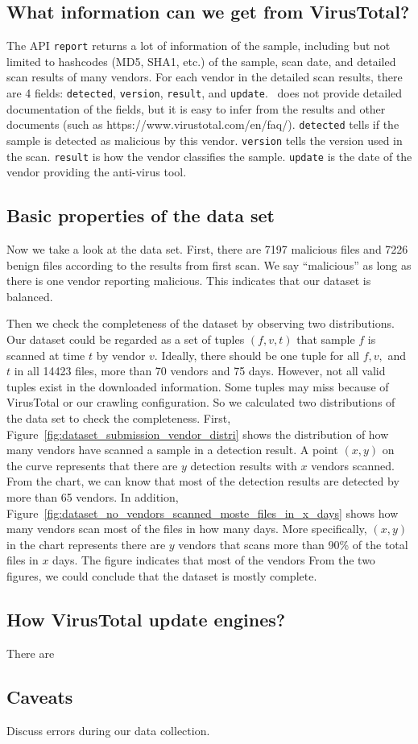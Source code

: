 \subsection{What information can we get from VirusTotal?}%

The API \texttt{report} returns a lot of information of the sample, including but not limited to hashcodes (MD5, SHA1, etc.) of the sample, scan date, and detailed scan results of many vendors. For each vendor in the detailed scan results, there are 4 fields: \texttt{detected}, \texttt{version}, \texttt{result}, and \texttt{update}. \vt\ does not provide detailed documentation of the fields, but it is easy to infer from the results and other documents (such as https://www.virustotal.com/en/faq/). \texttt{detected} tells if the sample is detected as malicious by this vendor. \texttt{version} tells the version used in the scan. \texttt{result} is how the vendor classifies the sample. \texttt{update} is the date of the vendor providing the anti-virus tool.

\subsection{Basic properties of the data set}

Now we take a look at the data set. First, there are 7197 malicious files and 7226 benign files according to the results from first scan. We say ``malicious'' as long as there is one vendor reporting malicious. This indicates that our dataset is balanced.

Then we check the completeness of the dataset by observing two distributions. 
Our dataset could be regarded as a set of tuples $(f, v, t)$ that sample $f$ is scanned at time $t$ by vendor $v$. Ideally, there should be one tuple for all $f, v, $ and $t$ in all 14423 files, more than 70 vendors and 75 days. 
However, not all valid tuples exist in the downloaded information. Some tuples may miss because of VirusTotal or our crawling configuration. So we calculated two distributions of the data set to check the completeness.
First, Figure~\ref{fig:dataset_submission_vendor_distri} shows the distribution of how many vendors have scanned a sample in a detection result. A point $(x, y)$ on the curve represents that there are $y$ detection results with $x$ vendors scanned. From the chart, we can know that most of the detection results are detected by more than 65 vendors. 
In addition, Figure~\ref{fig:dataset_no_vendors_scanned_moste_files_in_x_days} shows  how many vendors scan most of the files in how many days. More specifically, $(x, y)$ in the chart represents there are $y$ vendors that scans more than 90\% of the total files in $x$ days. The figure indicates that most of the vendors 
From the two figures, we could conclude that the dataset is mostly complete.



\subsection{How VirusTotal update engines?}
There are 
\subsection{Caveats}

Discuss errors during our data collection. 
